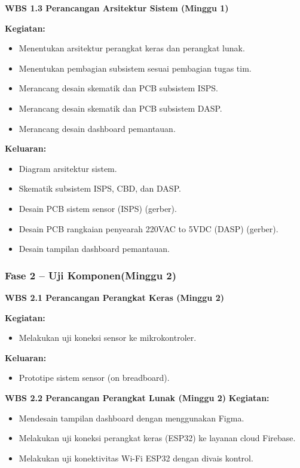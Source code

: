 \documentclass{elsinta}
\begin{document}
\textbf{WBS 1.3 Perancangan Arsitektur Sistem (Minggu 1)}

\textbf{Kegiatan:}
\begin{itemize}
    \item Menentukan arsitektur perangkat keras dan perangkat lunak.
    \item Menentukan pembagian subsistem sesuai pembagian tugas tim.
    \item Merancang desain skematik dan PCB subsistem ISPS.
    \item Merancang desain skematik dan PCB subsistem DASP.
    \item Merancang desain dashboard pemantauan.
\end{itemize}

\textbf{Keluaran:}
\begin{itemize}
    \item Diagram arsitektur sistem.
    \item Skematik subsistem ISPS, CBD, dan DASP.
    \item Desain PCB sistem sensor (ISPS) (gerber).
    \item Desain PCB rangkaian penyearah 220VAC to 5VDC (DASP) (gerber).
    \item Desain tampilan dashboard pemantauan.
\end{itemize}

\subsubsection*{Fase 2 -- Uji Komponen(Minggu 2)}

\textbf{WBS 2.1 Perancangan Perangkat Keras (Minggu 2)}

\textbf{Kegiatan:}
\begin{itemize}
    \item Melakukan uji koneksi sensor ke mikrokontroler.
\end{itemize}

\textbf{Keluaran:}
\begin{itemize}
    \item Prototipe sistem sensor (on breadboard).
\end{itemize}

    \textbf{WBS 2.2 Perancangan Perangkat Lunak (Minggu 2)}
\textbf{Kegiatan:}
\begin{itemize}
    \item Mendesain tampilan dashboard dengan menggunakan Figma.
    \item Melakukan uji koneksi perangkat keras (ESP32) ke layanan cloud Firebase.
    \item Melakukan uji konektivitas Wi-Fi ESP32 dengan divais kontrol.
\end{itemize}
\end{document}

